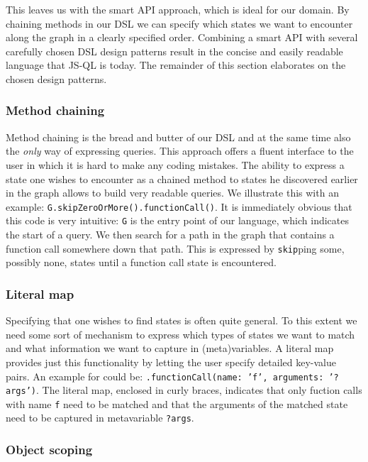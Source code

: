 This leaves us with the smart API approach, which is ideal for our domain. By chaining methods in our DSL we can specify which states we want to encounter along the graph in a clearly specified order. Combining a smart API with several carefully chosen DSL design patterns\cite{DSLFowler} result in the concise and easily readable language that JS-QL is today. The remainder of this section elaborates on the chosen design patterns.

\subsubsection*{Method chaining}

Method chaining is the bread and butter of our DSL and at the same time also the \textit{only} way of expressing queries. This approach offers a fluent interface to the user in which it is hard to make any coding mistakes. The ability to express a state one wishes to encounter as a chained method to states he discovered earlier in the graph allows to build very readable queries. We illustrate this with an example: \texttt{G.skipZeroOrMore().functionCall()}. It is immediately obvious that this code is very intuitive: \texttt{G} is the entry point of our language, which indicates the start of a query. We then search for a path in the graph that contains a function call somewhere down that path. This is expressed by \texttt{skip}ping some, possibly none, states until a function call state is encountered.

\subsubsection*{Literal map}
Specifying that one wishes to find states is often quite general. To this extent we need some sort of mechanism to express which types of states we want to match and what information we want to capture in (meta)variables. A literal map provides just this functionality by letting the user specify detailed key-value pairs. An example for could be: \texttt{.functionCall({name: 'f', arguments: '?args'})}. The literal map, enclosed in curly braces, indicates that only fuction calls with name \texttt{f} need to be matched and that the arguments of the matched state need to be captured in metavariable \texttt{?args}.

\subsubsection*{Object scoping}

